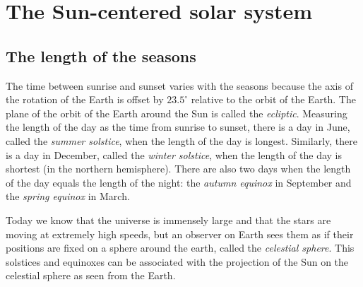 

\chapter{The Sun-centered solar system}\label{s.copernicus}

\section{The length of the seasons}

The time between sunrise and sunset varies with the seasons because the axis of the rotation of the Earth is offset by $23.5^\circ{}$ relative to the orbit of the Earth. The plane of the orbit of the Earth around the Sun is called the \emph{ecliptic}. Measuring the length of the day as the time from sunrise to sunset, there is a day in June, called the \emph{summer solstice}, when the length of the day is longest. Similarly, there is a day in December, called the \emph{winter solstice}, when the length of the day is shortest (in the northern hemisphere). There are also two days when the length of the day equals the length of the night: the \emph{autumn equinox} in September and the \emph{spring equinox} in March.

Today we know that the universe is immensely large and that the stars are moving at extremely high speeds, but an observer on Earth sees them as if their positions are fixed on a sphere around the earth, called the \emph{celestial sphere}. This solstices and equinoxes can be associated with the projection of the Sun on the celestial sphere as seen from the Earth.

